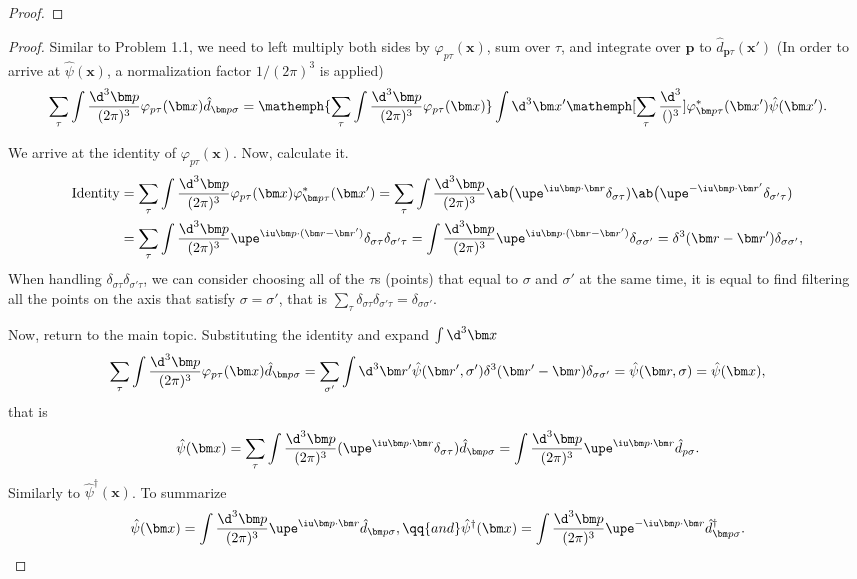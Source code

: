 \begin{solution}
\begin{proof}
\end{proof}
\begin{proof}
  Similar to Problem 1.1,
  we need to left multiply both sides by $\varphi_{p\tau}(\bm x)$,
  sum over $\tau$, and integrate over $\bm p$ to $\hat d_{\bm p\tau}(\bm x')$
  (In order to arrive at $\hat\psi(\bm x)$,
  a normalization factor $1/{(2\pi)^3}$ is applied)
  \[
    \sum_\tau \int \frac{\d^3\bm p}{(2\pi)^3}
      \varphi_{p\tau}(\bm x) \hat d_{\bm p\sigma}
  = \mathemph{\sum_\tau \int \frac{\d^3\bm p}{(2\pi)^3}
      \varphi_{p\tau}(\bm x)}
    \int \d^3 \bm x'
      \mathemph[\sum_\tau \frac{\d^3}{()^3}]
        {\varphi_{\bm p\tau}^*(\bm x')} \hat\psi(\bm x').
  \]
  \begin{shaded}
    We arrive at the identity of $\varphi_{p\tau}(\bm x)$.
    Now, calculate it.
    \begin{align*}
      \text{Identity} & = \sum_\tau \int \frac{\d^3\bm p}{(2\pi)^3}
        \varphi_{p\tau}(\bm x) \varphi_{\bm p\tau}^*(\bm x')
    = \sum_\tau \int \frac{\d^3\bm p}{(2\pi)^3}
      \ab\big(\upe^{\iu\bm p\cdot\bm r} \delta_{\sigma\tau})
      \ab\big(\upe^{-\iu\bm p\cdot\bm r'} \delta_{\sigma'\tau})\\
  & = \sum_\tau \int \frac{\d^3\bm p}{(2\pi)^3}
      \upe^{\iu\bm p\cdot(\bm r-\bm r')} \delta_{\sigma\tau}\delta_{\sigma'\tau}
    = \int \frac{\d^3\bm p}{(2\pi)^3}
      \upe^{\iu\bm p\cdot(\bm r-\bm r')} \delta_{\sigma\sigma'}
    = \delta^3(\bm r - \bm r') \delta_{\sigma\sigma'},
    \end{align*}
    When handling $\delta_{\sigma\tau}\delta_{\sigma'\tau}$,
    we can consider choosing all of the $\tau$s (points)
    that equal to $\sigma$ and $\sigma'$ at the same time,
    it is equal to find filtering all the points on the axis that satisfy
    $\sigma = \sigma'$, that is
    $\sum_\tau \delta_{\sigma\tau} \delta_{\sigma'\tau} = \delta_{\sigma\sigma'}$.
  \end{shaded}
  Now, return to the main topic.
  Substituting the identity and expand $\int \d^3 \bm x$
  \[
    \sum_\tau \int \frac{\d^3\bm p}{(2\pi)^3}
      \varphi_{p\tau}(\bm x) \hat d_{\bm p\sigma}
  = \sum_{\sigma'} \int \d^3 \bm r' \hat\psi(\bm r', \sigma')
    \delta^3(\bm r' - \bm r) \delta_{\sigma\sigma'}
  = \hat\psi(\bm r,\sigma) = \hat\psi(\bm x),
  \]
  that is
  \[
    \hat\psi(\bm x) = \sum_\tau \int \frac{\d^3\bm p}{(2\pi)^3}
      (\upe^{\iu\bm p\cdot\bm r} \delta_{\sigma\tau}) \hat d_{\bm p\sigma}
  = \int \frac{\d^3\bm p}{(2\pi)^3} \upe^{\iu\bm p\cdot\bm r} \hat d_{p\sigma}.
  \]
  Similarly to $\hat\psi^\dagger(\bm x)$. To summarize
  \[
    \hat\psi(\bm x) = \int \frac{\d^3\bm p}{(2\pi)^3}
      \upe^{\iu\bm p\cdot\bm r} \hat d_{\bm p\sigma}, \qq{and}
    \hat\psi^\dagger(\bm x) = \int \frac{\d^3\bm p}{(2\pi)^3}
      \upe^{-\iu\bm p \cdot\bm r} \hat d_{\bm p\sigma}^\dagger.
  \]
\end{proof}
\end{solution}